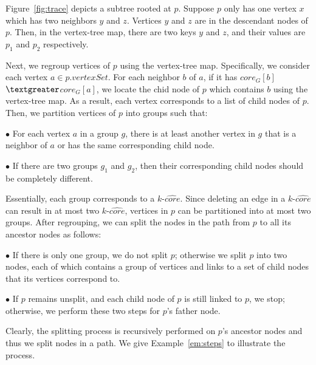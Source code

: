 \begin{example}
\label{em:reorganize}
Figure~\ref{fig:trace} depicts a subtree rooted at $p$.
Suppose $p$ only has one vertex $x$ which has two neighbors $y$ and $z$.
Vertices $y$ and $z$ are in the descendant nodes of $p$.
Then, in the vertex-tree map, there are two keys $y$ and $z$,
and their values are $p_1$ and $p_2$ respectively.
\end{example}

Next, we regroup vertices of $p$ using the vertex-tree map.
Specifically, we consider each vertex $a$$\in p.vertexSet$.
For each neighbor $b$ of $a$, if it has $core_G[b]$$\textgreater$$core_G[a]$,
we locate the chid node of $p$ which contains $b$ using the vertex-tree map.
As a result, each vertex corresponds to a list of child nodes of $p$.
Then, we partition vertices of $p$ into groups such that:

\noindent $\bullet$ For each vertex $a$ in a group $g$,
there is at least another vertex in $g$ that is a neighbor of $a$ or has the same corresponding child node.

\noindent $\bullet$ If there are two groups $g_1$ and $g_2$, then their corresponding
child nodes should be completely different.

Essentially, each group corresponds to a $k$-$\widehat{core}$.
Since deleting an edge in a $k$-$\widehat{core}$ can result in at most two $k$-$\widehat{core}$,
vertices in $p$ can be partitioned into at most two groups.
After regrouping, we can split the nodes in the path from $p$ to all its ancestor nodes as follows:

\noindent $\bullet$ If there is only one group, we do not split $p$; otherwise we split $p$ into two nodes, each of which contains a group of vertices and links to a set of child nodes that its vertices correspond to.

\noindent $\bullet$ If $p$ remains unsplit, and each child node of $p$ is still linked to $p$, we stop; otherwise, we perform these two steps for $p$'s father node.

Clearly, the splitting process is recursively performed on $p$'s ancestor nodes and thus we split nodes in a path.
We give Example~\ref{em:steps} to illustrate the process.

